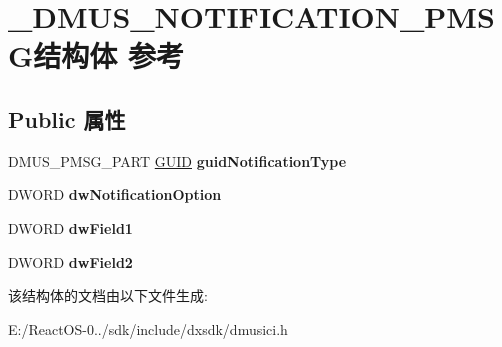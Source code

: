\hypertarget{struct___d_m_u_s___n_o_t_i_f_i_c_a_t_i_o_n___p_m_s_g}{}\section{\+\_\+\+D\+M\+U\+S\+\_\+\+N\+O\+T\+I\+F\+I\+C\+A\+T\+I\+O\+N\+\_\+\+P\+M\+S\+G结构体 参考}
\label{struct___d_m_u_s___n_o_t_i_f_i_c_a_t_i_o_n___p_m_s_g}
\subsection*{Public 属性}
\begin{DoxyCompactItemize}
\item 
\mbox{\label{struct___d_m_u_s___n_o_t_i_f_i_c_a_t_i_o_n___p_m_s_g_a82a81e5463e95c0bb9617eb287c85ad1}} 
D\+M\+U\+S\+\_\+\+P\+M\+S\+G\+\_\+\+P\+A\+RT \hyperlink{interface_g_u_i_d}{G\+U\+ID} {\bfseries guid\+Notification\+Type}
\item 
\mbox{\label{struct___d_m_u_s___n_o_t_i_f_i_c_a_t_i_o_n___p_m_s_g_a5114ef2ea8983131c21d754bcfc1e3d6}} 
D\+W\+O\+RD {\bfseries dw\+Notification\+Option}
\item 
\mbox{\label{struct___d_m_u_s___n_o_t_i_f_i_c_a_t_i_o_n___p_m_s_g_a9e4f7a344a22c20b36ecdc7bec59d94b}} 
D\+W\+O\+RD {\bfseries dw\+Field1}
\item 
\mbox{\label{struct___d_m_u_s___n_o_t_i_f_i_c_a_t_i_o_n___p_m_s_g_a296b208c0857e3b583f75987bb2b91bc}} 
D\+W\+O\+RD {\bfseries dw\+Field2}
\end{DoxyCompactItemize}


该结构体的文档由以下文件生成\+:\begin{DoxyCompactItemize}
\item 
E\+:/\+React\+O\+S-\/0../sdk/include/dxsdk/dmusici.\+h\end{DoxyCompactItemize}
